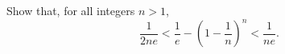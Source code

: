 Show that, for all integers $n > 1$,
\[
\frac{1}{2ne} < \frac{1}{e} - \left( 1 - \frac{1}{n} \right)^n
< \frac{1}{ne}.
\]
